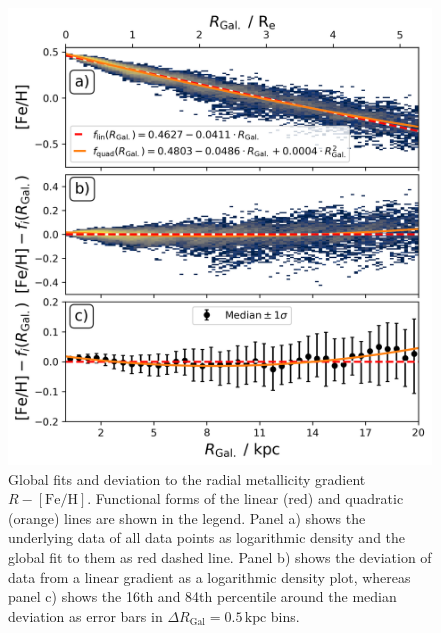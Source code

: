 \documentclass[fleqn,usenatbib]{mnras}
\begin{document}
\begin{figure}
    \centering
    \includegraphics[width=\columnwidth]{figures/global_r_feh_fit.png}
    \caption{Global fits and deviation to the radial metallicity gradient $R-\mathrm{[Fe/H]}$. Functional forms of the linear (red) and quadratic (orange) lines are shown in the legend. Panel a) shows the underlying data of all data points as logarithmic density and the global fit to them as red dashed line. Panel b) shows the deviation of data from a linear gradient as a logarithmic density plot, whereas panel c) shows the 16th and 84th percentile around the median deviation as error bars in $\Delta R_\mathrm{Gal} = 0.5\,\mathrm{kpc}$ bins.}
    \label{fig:global_r_feh_fit}
\end{figure}
\end{document}
